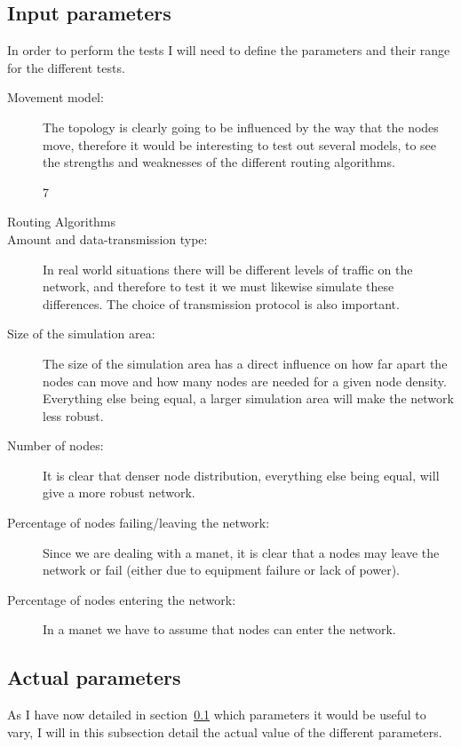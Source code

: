 \subsection{Input parameters}
\label{section:input_parameters}
In order to perform the tests I will need to define the parameters and their range for the different tests.
\begin{description}
\item[Movement model:] The topology is clearly going to be influenced by the way that the nodes move, therefore it would be interesting to test out several models, to see the strengths and weaknesses of the different routing algorithms.

7\item[Routing Algorithms] 

\item[Amount and data-transmission type:] In real world situations there will be different levels of traffic on the network, and therefore to test it we must likewise simulate these differences. The choice of transmission protocol is also important.

\item[Size of the simulation area:] The size of the simulation area has a direct influence on how far apart the nodes can move and how many nodes are needed for a given node density. Everything else being equal, a larger simulation area will make the network less robust.

\item[Number of nodes:] It is clear that denser node distribution, everything else being equal, will give a more robust network.

\item[Percentage of nodes failing/leaving the network:] Since we are dealing with a \ac{manet}, it is clear that a nodes may leave the network or fail (either due to equipment failure or lack of power). 

\item[Percentage of nodes entering the network:] In a \ac{manet} we have to assume that nodes can enter the network.
\end{description}

\subsection{Actual parameters}
As I have now detailed in section~\ref{section:input_parameters} which parameters it would be useful to vary, I will in this subsection detail the actual value of the different parameters. 

